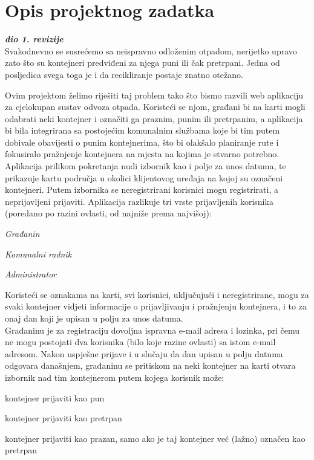 \chapter{Opis projektnog zadatka}

\textbf{\textit{dio 1. revizije}}\\

Svakodnevno se susrećemo sa neispravno odloženim otpadom, nerijetko upravo zato što su kontejneri predviđeni za njega puni ili čak pretrpani. Jedna od posljedica svega toga je i da recikliranje postaje znatno otežano. 

Ovim projektom želimo riješiti taj problem tako što bismo razvili web aplikaciju za cjelokupan sustav odvoza otpada. Koristeći se njom, građani bi na karti mogli odabrati neki kontejner i označiti ga praznim, punim ili pretrpanim, a aplikacija bi bila integrirana sa postojećim komunalnim službama koje bi tim putem dobivale obavijesti o punim kontejnerima, što bi olakšalo planiranje rute i fokusiralo pražnjenje kontejnera na mjesta na kojima je stvarno potrebno.\\

Aplikacija prilikom pokretanja nudi izbornik kao i polje za unos datuma, te prikazuje kartu područja u okolici klijentovog uređaja na kojoj su označeni kontejneri. Putem izbornika se neregistrirani korisnici mogu registrirati, a neprijavljeni prijaviti. Aplikacija razlikuje tri vrste prijavljenih korisnika (poredano po razini ovlasti, od najniže prema najvišoj):
\begin{packed_item}
	\item \textit{Građanin}
	\item \textit{Komunalni radnik}
	\item \textit{Administrator}
\end{packed_item}

Koristeći se oznakama na karti, svi korisnici, uključujući i neregistrirane, mogu za svaki kontejner vidjeti informacije o prijavljivanju i pražnjenju kontejnera, i to za onaj dan koji je upisan u polju za unos datuma.\\

Građaninu je za registraciju dovoljna ispravna e-mail adresa i lozinka, pri čemu ne mogu postojati dva korisnika (bilo koje razine ovlasti) sa istom e-mail adresom. 
Nakon uspješne prijave i u slučaju da dan upisan u polju datuma odgovara današnjem, građaninu se pritiskom na neki kontejner na karti otvara izbornik nad tim kontejnerom putem kojega korisnik može:
\begin{packed_item}
	\item kontejner prijaviti kao pun
	\item kontejner prijaviti kao pretrpan
	\item kontejner prijaviti kao prazan, samo ako je taj kontejner već (lažno) označen kao pretrpan
\end{packed_item}

